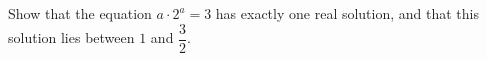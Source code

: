 Show that the equation $a\cdot2^a=3$ has exactly one real solution, and that this solution lies between $1$ and $\dfrac{3}{2}$.
